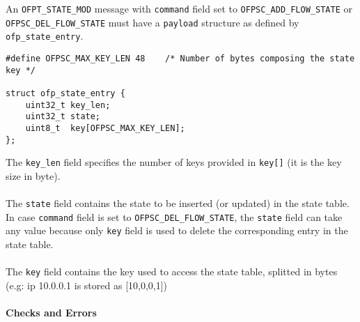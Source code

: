 \noindent
An \texttt{OFPT\_STATE\_MOD} message with \texttt{command} field set to \texttt{OFPSC\_ADD\_FLOW\_STATE} or \texttt{OFPSC\_DEL\_FLOW\_STATE} must have a \texttt{payload} structure as defined by \texttt{ofp\_state\_entry}.
\scriptsize
\begin{verbatim}
#define OFPSC_MAX_KEY_LEN 48    /* Number of bytes composing the state key */

struct ofp_state_entry {
    uint32_t key_len;
    uint32_t state;
    uint8_t  key[OFPSC_MAX_KEY_LEN];
};
\end{verbatim}
\normalsize
The \texttt{key\_len} field specifies the number of keys provided in \texttt{key[]} (it is the key size in byte).
\\\\
The \texttt{state} field contains the state to be inserted (or updated) in the state table. In case \texttt{command} field is set to \texttt{OFPSC\_DEL\_FLOW\_STATE}, the \texttt{state} field can take any value because only \texttt{key} field is used to delete the corresponding entry in the state table.
\\\\
The \texttt{key} field contains the key used to access the state table, splitted in bytes (e.g: ip 10.0.0.1 is stored as [10,0,0,1])



\paragraph{Checks and Errors}

